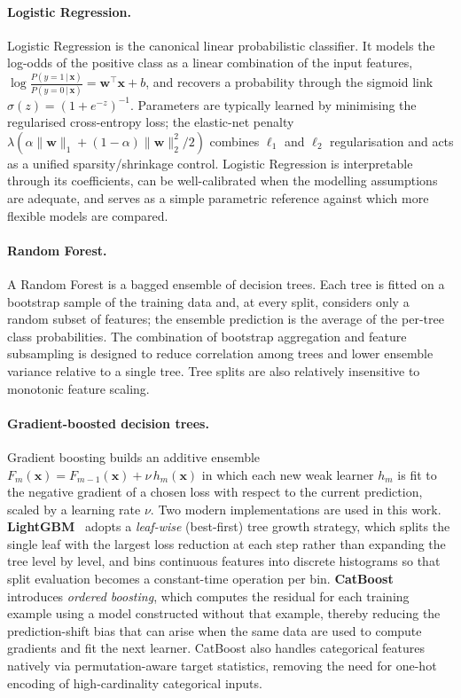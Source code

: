 \paragraph{Logistic Regression.}
Logistic Regression is the canonical linear probabilistic classifier. It
models the log-odds of the positive class as a linear combination of the input
features, $\log\!\frac{P(y{=}1\,|\,\mathbf{x})}{P(y{=}0\,|\,\mathbf{x})} = \mathbf{w}^{\top}\mathbf{x} + b$,
and recovers a probability through the sigmoid link $\sigma(z)=(1+e^{-z})^{-1}$.
Parameters are typically learned by minimising the regularised
cross-entropy loss; the elastic-net penalty
$\lambda(\alpha\|\mathbf{w}\|_1 + (1-\alpha)\|\mathbf{w}\|_2^2/2)$ combines
$\ell_1$ and $\ell_2$ regularisation and acts as a unified sparsity/shrinkage
control. Logistic Regression is interpretable through its coefficients, can be
well-calibrated when the modelling assumptions are adequate, and serves as a
simple parametric reference against which more flexible models are compared.

\paragraph{Random Forest.}
A Random Forest is a bagged ensemble of decision trees. Each tree is fitted on a
bootstrap sample of the training data and, at every split, considers only a
random subset of features; the ensemble prediction is the average of the
per-tree class probabilities. The combination of bootstrap aggregation and
feature subsampling is designed to reduce correlation among trees and lower
ensemble variance relative to a single tree. Tree splits are also relatively
insensitive to monotonic feature scaling.

\paragraph{Gradient-boosted decision trees.}
Gradient boosting builds an additive ensemble
$F_{m}(\mathbf{x}) = F_{m-1}(\mathbf{x}) + \nu\, h_m(\mathbf{x})$ in which
each new weak learner $h_m$ is fit to the negative gradient of a chosen loss
with respect to the current prediction, scaled by a learning rate $\nu$. Two
modern implementations are used in this work. \textbf{LightGBM}~\cite{ke2017lightgbm}
adopts a \emph{leaf-wise} (best-first) tree growth strategy, which splits the
single leaf with the largest loss reduction at each step rather than expanding
the tree level by level, and bins continuous features into discrete histograms
so that split evaluation becomes a constant-time operation per bin.
\textbf{CatBoost}~\cite{prokhorenkova2018catboost} introduces \emph{ordered
boosting}, which computes the residual for each training example using a model
constructed without that example, thereby reducing the prediction-shift bias
that can arise when the same data are used to compute gradients and fit the
next learner. CatBoost also handles categorical
features natively via permutation-aware target statistics, removing the need
for one-hot encoding of high-cardinality categorical inputs.

